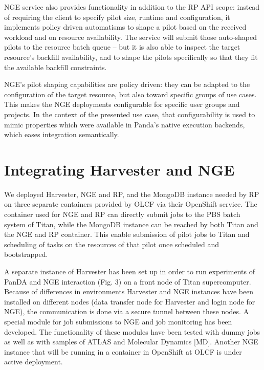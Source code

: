 \documentclass{webofc}
\begin{document}
NGE service also provides functionality in addition to the RP API scope:
instead of requiring the client to specify pilot size, runtime and
configuration, it implements policy driven automatisms to shape a pilot based
on the received workload and on resource availability.  The service will
submit those auto-shaped pilots to the resource batch queue -- but it is also
able to inspect the target resource's backfill availability, and to shape the
pilots specifically so that they fit the available backfill constraints.
	
NGE's pilot shaping capabilities are policy driven: they can be adapted to
the configuration of the target resource, but also toward specific groups of
use cases. This makes the NGE deployments configurable for specific user
groups and projects.  In the context of the presented use case, that
configurability is used to mimic properties which were available in Panda's
native execution backends, which eases integration semantically.


\section{Integrating Harvester and NGE}

We deployed Harvester, NGE and RP, and the MongoDB instance needed by RP on
three separate containers provided by OLCF via their OpenShift service. The
container used for NGE and RP can directly submit jobs to the PBS batch
system of Titan, while the MongoDB instance can be reached by both Titan and
the NGE and RP container. This enable submission of pilot jobs to Titan and
scheduling of tasks on the resources of that pilot once scheduled and
bootstrapped.

A separate instance of Harvester has been set up in order to run experiments
of PanDA and NGE interaction (Fig. 3) on a front node of Titan supercomputer.
Because of differences in environments Harvester and NGE instances have been
installed on different nodes (data transfer node for Harvester and login node
for NGE), the communication is done via a secure tunnel between these nodes.
A special module for job submissions to NGE and job monitoring has been
developed. The functionality of these modules have been tested with dummy
jobs as well as with samples of ATLAS and Molecular Dynamics [MD]. Another
NGE instance that will be running in a container in OpenShift at OLCF is
under active deployment.
\end{document}
